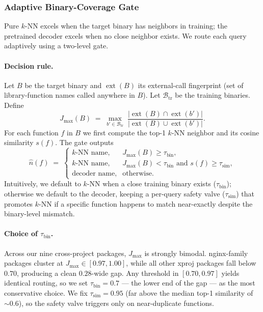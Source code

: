 
\subsubsection{Adaptive Binary-Coverage Gate}
\label{sec:adaptive-gate}

Pure $k$-NN excels when the target binary has neighbors in training; the pretrained decoder excels when no close neighbor exists. We route each query adaptively using a two-level gate.

\paragraph{Decision rule.}
Let $B$ be the target binary and $\operatorname{ext}(B)$ its external-call fingerprint (set of library-function names called anywhere in $B$). Let $\mathcal{B}_{\text{tr}}$ be the training binaries. Define
\[
J_{\max}(B) \;=\; \max_{b' \in \mathcal{B}_{\text{tr}}}\; \frac{|\operatorname{ext}(B) \cap \operatorname{ext}(b')|}{|\operatorname{ext}(B) \cup \operatorname{ext}(b')|}.
\]
For each function $f$ in $B$ we first compute the top-1 $k$-NN neighbor and its cosine similarity $s(f)$. The gate outputs
\[
\hat{n}(f) \;=\;
\begin{cases}
\text{$k$-NN name}, & J_{\max}(B) \ge \tau_{\text{bin}},\\[2pt]
\text{$k$-NN name}, & J_{\max}(B) < \tau_{\text{bin}} \text{ and } s(f) \ge \tau_{\text{sim}},\\[2pt]
\text{decoder name}, & \text{otherwise}.
\end{cases}
\]
Intuitively, we default to $k$-NN when a close training binary exists ($\tau_{\text{bin}}$); otherwise we default to the decoder, keeping a per-query safety valve ($\tau_{\text{sim}}$) that promotes $k$-NN if a specific function happens to match near-exactly despite the binary-level mismatch.

\paragraph{Choice of $\tau_{\text{bin}}$.}
Across our nine cross-project packages, $J_{\max}$ is strongly bimodal. nginx-family packages cluster at $J_{\max} \in [0.97, 1.00]$, while all other xproj packages fall below $0.70$, producing a clean $0.28$-wide gap. Any threshold in $[0.70, 0.97]$ yields identical routing, so we set $\tau_{\text{bin}}{=}0.7$ — the lower end of the gap — as the most conservative choice. We fix $\tau_{\text{sim}}{=}0.95$ (far above the median top-1 similarity of $\sim\!0.6$), so the safety valve triggers only on near-duplicate functions.

